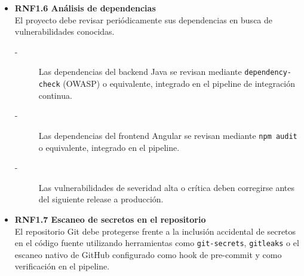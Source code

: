 \begin{itemize}
    \item \textbf{RNF1.6 Análisis de dependencias} \\
    El proyecto debe revisar periódicamente sus dependencias en busca de
    vulnerabilidades conocidas.
    \begin{description}
        \item[-] Las dependencias del backend Java se revisan mediante
        \texttt{dependency-check} (OWASP) o equivalente, integrado en el pipeline
        de integración continua.
        \item[-] Las dependencias del frontend Angular se revisan mediante \texttt{npm audit}
        o equivalente, integrado en el pipeline.
        \item[-] Las vulnerabilidades de severidad alta o crítica deben corregirse
        antes del siguiente release a producción.
    \end{description}


    \item \textbf{RNF1.7 Escaneo de secretos en el repositorio} \\
    El repositorio Git debe protegerse frente a la inclusión accidental
    de secretos en el código fuente utilizando herramientas como \texttt{git-secrets}, \texttt{gitleaks} o el escaneo nativo de GitHub configurado
    como hook de pre-commit y como verificación en el pipeline.
\end{itemize}



